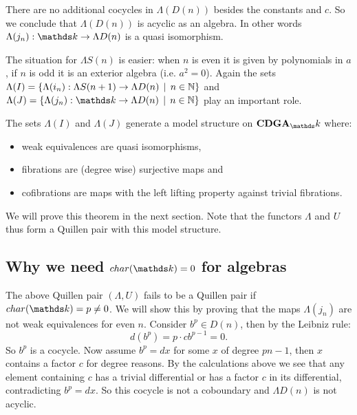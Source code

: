 There are no additional cocycles in $\Lambda(D(n))$ besides the constants and $c$. So we conclude that $\Lambda(D(n))$ is acyclic as an algebra. In other words $\Lambda(j_n): \k \to \Lambda D(n)$ is a quasi isomorphism.

The situation for $\Lambda S(n)$ is easier: when $n$ is even it is given by polynomials in $a$, if $n$ is odd it is an exterior algebra  (i.e. $a^2 = 0$). Again the sets $\Lambda(I) = \{ \Lambda(i_n) : \Lambda S(n+1) \to \Lambda D(n) \,\mid\, n \in \mathbb{N}\}$ and $\Lambda(J) = \{ \Lambda(j_n) : \k \to \Lambda D(n) \I n \in \N\}$ play an important role.

\begin{theorem}
	The sets $\Lambda(I)$ and $\Lambda(J)$ generate a model structure on $\CDGA_\k$ where:
	\begin{itemize}
		\item weak equivalences are quasi isomorphisms,
		\item fibrations are (degree wise) surjective maps and
		\item cofibrations are maps with the left lifting property against trivial fibrations.
	\end{itemize}
\end{theorem}

We will prove this theorem in the next section. Note that the functors $\Lambda$ and $U$ thus form a Quillen pair with this model structure.

\subsection{Why we need $\Char{\k} = 0$ for algebras}
The above Quillen pair $(\Lambda, U)$ fails to be a Quillen pair if $\Char{\k} = p \neq 0$. We will show this by proving that the maps $\Lambda(j_n)$ are not weak equivalences for even $n$. Consider $b^p \in D(n)$, then by the Leibniz rule:
$$ d(b^p) = p \cdot c b^{p-1} = 0. $$
So $b^p$ is a cocycle. Now assume $b^p = d x$ for some $x$ of degree $p n - 1$, then $x$ contains a factor $c$ for degree reasons. By the calculations above we see that any element containing $c$ has a trivial differential or has a factor $c$ in its differential, contradicting $b^p =  d x$. So this cocycle is not a coboundary and $\Lambda D(n)$ is not acyclic.

